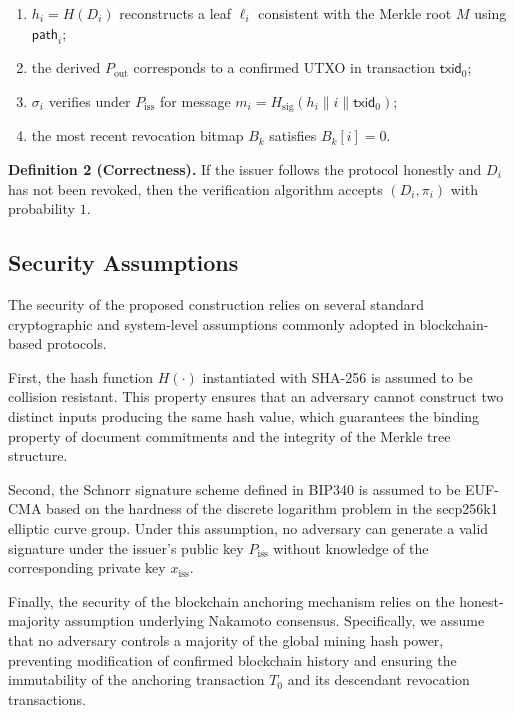 \documentclass{IEEEoj}
\begin{document}
\begin{enumerate}
    \item $h_i = H(D_i)$ reconstructs a leaf $\ell_i$ consistent with the Merkle root $M$ using $\mathsf{path}_i$;
    \item the derived $P_{\mathrm{out}}$ corresponds to a confirmed UTXO in transaction $\mathsf{txid}_0$;
    \item $\sigma_i$ verifies under $P_{\mathrm{iss}}$ for message 
    $m_i = H_{\mathrm{sig}}(h_i \parallel i \parallel \mathsf{txid}_0)$;
    \item the most recent revocation bitmap $B_k$ satisfies $B_k[i] = 0$.
\end{enumerate}


\textbf{Definition 2 (Correctness).}  
If the issuer follows the protocol honestly and $D_i$ has not been revoked, then the verification algorithm accepts $(D_i, \pi_i)$ with probability $1$.

\subsection{Security Assumptions}

The security of the proposed construction relies on several standard cryptographic and system-level assumptions commonly adopted in blockchain-based protocols.

First, the hash function $H(\cdot)$ instantiated with SHA-256 is assumed to be collision resistant. This property ensures that an adversary cannot construct two distinct inputs producing the same hash value, which guarantees the binding property of document commitments and the integrity of the Merkle tree structure.

Second, the Schnorr signature scheme defined in BIP340 is assumed to be EUF-CMA based on the hardness of the discrete logarithm problem in the secp256k1 elliptic curve group. Under this assumption, no adversary can generate a valid signature under the issuer's public key $P_{\mathrm{iss}}$ without knowledge of the corresponding private key $x_{\mathrm{iss}}$.

Finally, the security of the blockchain anchoring mechanism relies on the honest-majority assumption underlying Nakamoto consensus. Specifically, we assume that no adversary controls a majority of the global mining hash power, preventing modification of confirmed blockchain history and ensuring the immutability of the anchoring transaction $T_0$ and its descendant revocation transactions.
\end{document}
